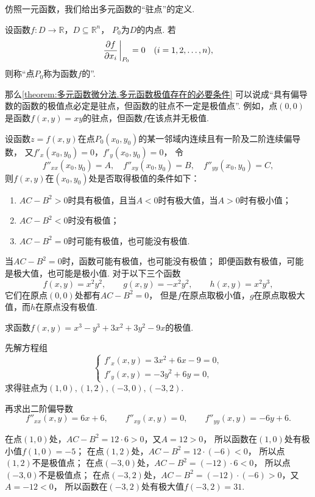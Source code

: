 仿照一元函数，我们给出多元函数的“驻点”的定义.
\begin{definition}
设函数\(f\colon D \to \mathbb{R}\)，\(D \subseteq \mathbb{R}^n\)，
\(P_0\)为\(D\)的内点.
若\[
	\pdv{f}{x_i}\eval_{P_0}=0
	\quad(i=1,2,\dotsc,n),
\]
则称“点\(P_0\)称为函数\(f\)的”.
\end{definition}
那么\cref{theorem:多元函数微分法.多元函数极值存在的必要条件}
可以说成“具有偏导数的函数的极值点必定是驻点，但函数的驻点不一定是极值点”.
例如，点\((0,0)\)是函数\(f(x,y) = xy\)的驻点，但函数\(f\)在该点并无极值.

\begin{theorem}[充分条件]\label{theorem:多元函数微分法.多元函数极值存在的充分条件}
设函数\(z=f(x,y)\)在点\(P_0(x_0,y_0)\)的某一邻域内连续且有一阶及二阶连续偏导数，
又\(f'_x(x_0,y_0)=0\)，\(f'_y(x_0,y_0)=0\)，
令\[
	f''_{xx}(x_0,y_0)=A, \quad
	f''_{xy}(x_0,y_0)=B, \quad
	f''_{yy}(x_0,y_0)=C,
\]
则\(f(x,y)\)在\((x_0,y_0)\)处是否取得极值的条件如下：
\begin{enumerate}
	\item \(AC-B^2>0\)时具有极值，且当\(A<0\)时有极大值，当\(A>0\)时有极小值；
	\item \(AC-B^2<0\)时没有极值；
	\item \(AC-B^2=0\)时可能有极值，也可能没有极值.
\end{enumerate}
\end{theorem}

\begin{example}
当\(AC-B^2=0\)时，函数可能有极值，也可能没有极值；
即便函数有极值，可能是极大值，也可能是极小值.
对于以下三个函数\[
	f(x,y) = x^2 y^2,
	\qquad
	g(x,y) = -x^2 y^2,
	\qquad
	h(x,y) = x^2 y^3,
\]
它们在原点\((0,0)\)处都有\(AC-B^2=0\)，
但是\(f\)在原点取极小值，\(g\)在原点取极大值，而\(h\)在原点没有极值.
\end{example}

\begin{example}
求函数\(f(x,y) = x^3-y^3+3x^2+3y^2-9x\)的极值.
\begin{solution}
先解方程组\[
	\left\{ \begin{array}{l}
		f'_x(x,y) = 3x^2+6x-9 = 0, \\
		f'_y(x,y) = -3y^2+6y = 0,
	\end{array} \right.
\]
求得驻点为\((1,0),(1,2),(-3,0),(-3,2)\).

再求出二阶偏导数\[
	f''_{xx}(x,y) = 6x+6,
	\qquad
	f''_{xy}(x,y) = 0,
	\qquad
	f''_{yy}(x,y) = -6y+6.
\]

在点\((1,0)\)处，\(AC-B^2=12\cdot6>0\)，又\(A=12>0\)，
所以函数在\((1,0)\)处有极小值\(f(1,0)=-5\)；
在点\((1,2)\)处，\(AC-B^2=12\cdot(-6)<0\)，
所以点\((1,2)\)不是极值点；
在点\((-3,0)\)处，\(AC-B^2=(-12)\cdot6<0\)，
所以点\((-3,0)\)不是极值点；
在点\((-3,2)\)处，\(AC-B^2=(-12)\cdot(-6)>0\)，又\(A=-12<0\)，
所以函数在\((-3,2)\)处有极大值\(f(-3,2)=31\).
\end{solution}
\end{example}

